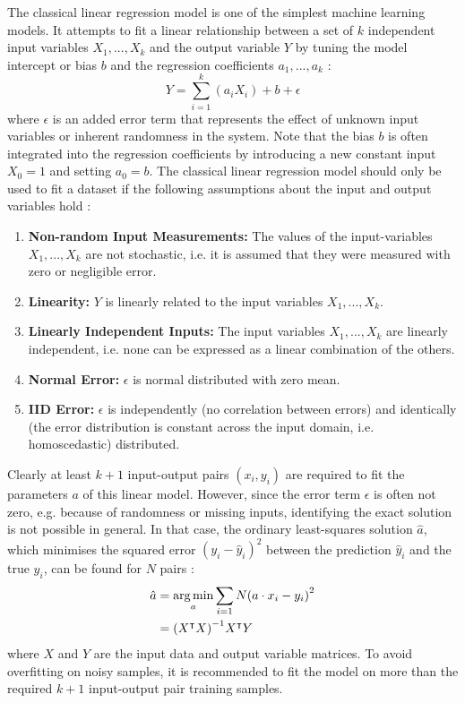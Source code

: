 The classical linear regression model is one of the simplest machine learning models. It attempts to fit a linear relationship between a set of $k$ independent input variables $X_1, ..., X_k$ and the output variable $Y$ by tuning the model intercept or bias $b$ and the regression coefficients $a_1, ..., a_k$ \cite{clrm-assuptions-1971}:
\begin{equation}
    Y = \sum_{i=1}^{k}{(a_i X_i)} + b + \epsilon
\end{equation}
where $\epsilon$ is an added error term that represents the effect of unknown input variables or inherent randomness in the system. Note that the bias $b$ is often integrated into the regression coefficients by introducing a new constant input $X_0 = 1$ and setting $a_0 = b$. The classical linear regression model should only be used to fit a dataset if the following assumptions about the input and output variables hold \cite{clrm-assuptions-1971}:
\begin{enumerate}
    \item \textbf{Non-random Input Measurements:} The values of the input-variables $X_1, ..., X_k$ are not stochastic, i.e. it is assumed that they were measured with zero or negligible error.
    \item \textbf{Linearity:} $Y$ is linearly related to the input variables $X_1, ..., X_k$.
    \item \textbf{Linearly Independent Inputs:} The input variables $X_1, ..., X_k$ are linearly independent, i.e. none can be expressed as a linear combination of the others.
    \item \textbf{Normal Error:} $\epsilon$ is normal distributed with zero mean.
    \item \textbf{IID Error:} $\epsilon$ is independently (no correlation between errors) and identically (the error distribution is constant across the input domain, i.e. homoscedastic) distributed.
\end{enumerate}

\noindent Clearly at least $k+1$ input-output pairs $(x_i, y_i)$ are required to fit the parameters $a$ of this linear model. However, since the error term $\epsilon$ is often not zero, e.g. because of randomness or missing inputs, identifying the exact solution is not possible in general. In that case, the ordinary least-squares solution $\hat{a}$, which minimises the squared error $(y_i-\hat{y}_i)^2$ between the prediction $\hat{y}_i$ and the true $y_i$, can be found for $N$ pairs \cite[P/mlr-ols]{stats-proofs-2022}:
\begin{equation}
    \begin{split}
        \hat{a} &= \operatorname*{arg\,min}_{a}{\sum_{i=1}{N}{\left( a \cdot x_i - y_i \right)^2}} \\
                &= {\left( X^{\intercal} X \right)}^{-1} X^{\intercal} Y
    \end{split}
\end{equation}
where $X$ and $Y$ are the input data and output variable matrices. To avoid overfitting on noisy samples, it is recommended to fit the model on more than the required $k+1$ input-output pair training samples.

